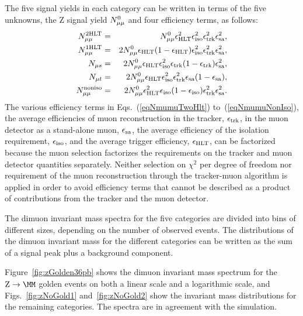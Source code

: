 The five signal yields in each category can be written in terms of
the five unknowns, the Z signal yield $N^0_{\mu\mu}$ and four efficiency terms, as follows:
\begin{eqnarray}
 \label{eqNmumuTwoHlt}
   N_{\mu\mu}^{2\mathrm{HLT}} & = & N^0_{\mu\mu} \epsilon_\mathrm{HLT}^2 \epsilon_\mathrm{iso}^2 \epsilon_\mathrm{trk}^2 \epsilon_\mathrm{sa}^2,  \\
  \label{eqNmumuOneHlt}
   N_{\mu\mu}^{1\mathrm{HLT}} & = & 2 N^0_{\mu\mu} \epsilon_\mathrm{HLT} (1 - \epsilon_\mathrm{HLT}) \epsilon_\mathrm{iso}^2 \epsilon_\mathrm{trk}^2 \epsilon_\mathrm{sa}^2,  \\
  \label{eqNmus}
   N_{\mu s} & = & 2 N^0_{\mu\mu} \epsilon_\mathrm{HLT} \epsilon_\mathrm{iso}^2 \epsilon_\mathrm{trk} (1 - \epsilon_\mathrm{trk}) \epsilon_\mathrm{sa}^2,  \\
  \label{eqNmut}
   N_{\mu t} & = & 2 N^0_{\mu\mu} \epsilon_\mathrm{HLT} \epsilon_\mathrm{iso}^2 \epsilon_\mathrm{trk}^2 \epsilon_\mathrm{sa}(1 -\epsilon_\mathrm{sa}), \\
  \label{eqNmumuNonIso}
   N_{\mu\mu}^{\mathrm{noniso}} & = & 2 N^0_{\mu\mu} \epsilon_\mathrm{HLT}^2  \epsilon_\mathrm{iso} (1 - \epsilon_\mathrm{iso})  \epsilon_\mathrm{trk}^2 \epsilon_\mathrm{sa}^2.
\end{eqnarray}
The various efficiency terms in Eqs.~(\ref{eqNmumuTwoHlt}) to~(\ref{eqNmumuNonIso}),
the average efficiencies
of muon reconstruction in the tracker, $\epsilon_\mathrm{trk}$, in the muon detector as
a stand-alone muon, $\epsilon_\mathrm{sa}$, the average efficiency of the isolation requirement,
$\epsilon_\mathrm{iso}$, and the average trigger efficiency, $\epsilon_\mathrm{HLT}$,
can be factorized because the muon selection
factorizes the requirements on the tracker and muon detector quantities separately.
Neither selection on $\chi^2$ per degree of freedom nor requirement of the muon reconstruction through the
tracker-muon algorithm is applied in order to
avoid efficiency terms that cannot be described as a product of contributions from the tracker and
the muon detector.

The dimuon invariant mass spectra for the five categories are divided into
bins of different sizes, depending on the number of observed events.
The distributions of the dimuon invariant mass for the different categories can be written
as the sum of a signal peak plus a background component.


Figure~\ref{fig:zGolden36pb} shows the dimuon invariant mass spectrum for the $\Zmm$ golden events
on both a linear scale and a logarithmic scale, and Figs.~\ref{fig:zNoGold1}
and~\ref{fig:zNoGold2} show the
invariant mass distributions for the remaining categories.
The spectra are in agreement with the simulation.

